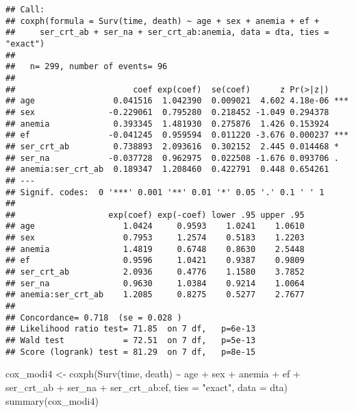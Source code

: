 \documentclass[
]{article}
\newenvironment{Shaded}{\begin{snugshade}}{\end{snugshade}}
\newcommand{\AttributeTok}[1]{\textcolor[rgb]{0.77,0.63,0.00}{#1}}
\newcommand{\FunctionTok}[1]{\textcolor[rgb]{0.00,0.00,0.00}{#1}}
\newcommand{\NormalTok}[1]{#1}
\newcommand{\OtherTok}[1]{\textcolor[rgb]{0.56,0.35,0.01}{#1}}
\newcommand{\SpecialCharTok}[1]{\textcolor[rgb]{0.00,0.00,0.00}{#1}}
\newcommand{\StringTok}[1]{\textcolor[rgb]{0.31,0.60,0.02}{#1}}
\begin{document}
\begin{verbatim}
## Call:
## coxph(formula = Surv(time, death) ~ age + sex + anemia + ef + 
##     ser_crt_ab + ser_na + ser_crt_ab:anemia, data = dta, ties = "exact")
## 
##   n= 299, number of events= 96 
## 
##                        coef exp(coef)  se(coef)      z Pr(>|z|)    
## age                0.041516  1.042390  0.009021  4.602 4.18e-06 ***
## sex               -0.229061  0.795280  0.218452 -1.049 0.294378    
## anemia             0.393345  1.481930  0.275876  1.426 0.153924    
## ef                -0.041245  0.959594  0.011220 -3.676 0.000237 ***
## ser_crt_ab         0.738893  2.093616  0.302152  2.445 0.014468 *  
## ser_na            -0.037728  0.962975  0.022508 -1.676 0.093706 .  
## anemia:ser_crt_ab  0.189347  1.208460  0.422791  0.448 0.654261    
## ---
## Signif. codes:  0 '***' 0.001 '**' 0.01 '*' 0.05 '.' 0.1 ' ' 1
## 
##                   exp(coef) exp(-coef) lower .95 upper .95
## age                  1.0424     0.9593    1.0241    1.0610
## sex                  0.7953     1.2574    0.5183    1.2203
## anemia               1.4819     0.6748    0.8630    2.5448
## ef                   0.9596     1.0421    0.9387    0.9809
## ser_crt_ab           2.0936     0.4776    1.1580    3.7852
## ser_na               0.9630     1.0384    0.9214    1.0064
## anemia:ser_crt_ab    1.2085     0.8275    0.5277    2.7677
## 
## Concordance= 0.718  (se = 0.028 )
## Likelihood ratio test= 71.85  on 7 df,   p=6e-13
## Wald test            = 72.51  on 7 df,   p=5e-13
## Score (logrank) test = 81.29  on 7 df,   p=8e-15
\end{verbatim}

\begin{Shaded}
\begin{Highlighting}[]
\NormalTok{cox\_modi4 }\OtherTok{\textless{}{-}} \FunctionTok{coxph}\NormalTok{(}\FunctionTok{Surv}\NormalTok{(time, death) }\SpecialCharTok{\textasciitilde{}}\NormalTok{ age }\SpecialCharTok{+}\NormalTok{ sex }\SpecialCharTok{+}\NormalTok{ anemia }\SpecialCharTok{+}\NormalTok{ ef }\SpecialCharTok{+}\NormalTok{ ser\_crt\_ab }\SpecialCharTok{+}\NormalTok{ ser\_na }\SpecialCharTok{+}\NormalTok{ ser\_crt\_ab}\SpecialCharTok{:}\NormalTok{ef, }\AttributeTok{ties =} \StringTok{"exact"}\NormalTok{, }\AttributeTok{data =}\NormalTok{ dta)}
\FunctionTok{summary}\NormalTok{(cox\_modi4)}
\end{Highlighting}
\end{Shaded}
\end{document}
